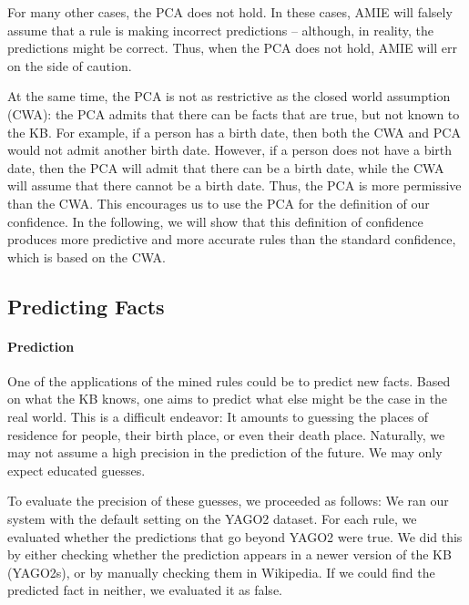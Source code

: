 For many other cases, the PCA does not hold. In these cases, AMIE will falsely assume that a rule is making incorrect predictions -- although, in reality,
the predictions might be correct.
Thus, when the PCA does not hold, AMIE will err on the side of caution.

At the same time, the PCA is not as restrictive as the closed world assumption (CWA):
the PCA admits that there can be facts that are true, but not known to the KB.
For example, if a person has a birth date, then both the CWA and PCA would not admit another birth date. However, if a person does not have a birth date, then the PCA will admit that there can be a birth date, while the CWA will assume that there cannot be a birth date. Thus, the PCA is more permissive than the CWA.
This encourages us to use the PCA for the definition of our confidence. In the following, we will show that this definition of confidence produces
 more predictive and more accurate rules than the standard confidence, which is based on the CWA.

\subsection{Predicting Facts}
\label{prediction}

\paragraph{Prediction} One of the applications of the mined rules could be to predict new facts. 
Based on what the KB knows, one aims to predict what else might be the case in the real world. 
This is a difficult endeavor: It amounts to guessing the places of residence for people, their birth place, or even their death place. 
Naturally, we may not assume a high precision in the prediction of the future. We may only expect educated guesses.

To evaluate the precision of these guesses, we proceeded as follows: 
We ran our system with the default setting on the YAGO2 dataset. 
For each rule, we evaluated whether the predictions that go beyond YAGO2 were true. 
We did this by either checking whether the prediction appears in a newer version of the KB (YAGO2s), 
or by manually checking them in Wikipedia. If we could find the predicted fact in neither, we evaluated it as false.

